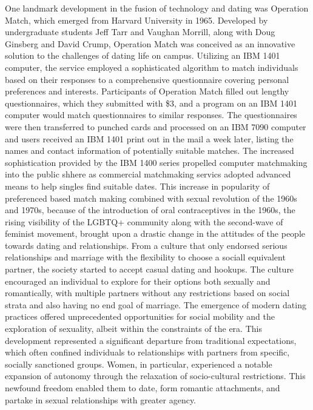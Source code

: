 One landmark development in the fusion of technology and dating was Operation Match, which emerged from Harvard University in 1965. Developed by undergraduate students Jeff Tarr and Vaughan Morrill, along with Doug Ginsberg and David Crump, Operation Match was conceived as an innovative solution to the challenges of dating life on campus. Utilizing an IBM 1401 computer, the service employed a sophisticated algorithm to match individuals based on their responses to a comprehensive questionnaire covering personal preferences and interests.\cite{noauthor_operation_1965}  Participants of Operation Match filled out lengthy questionnaires, which they submitted with \$3, and a program on an IBM 1401 computer would match questionnaires to similar responses.\cite{valley_new_2015}  The questionnaires were then transferred to punched cards and processed on an IBM 7090 computer and users received an IBM 1401 print out in the mail a week later, listing the names and contact information of potentially suitable matches. The increased sophistication provided by the IBM 1400 series propelled computer matchmaking into the public shhere as commercial matchmaking servics adopted advanced means to help singles find suitable dates. This increase in popularity of preferenced based match making combined with sexual revolution of the 1960s and 1970s, because of the introduction of oral contraceptives in the 1960s, the rising visibility of the LGBTQ+ community along with the second-wave of feminist movement,\cite{book:1309549} brought upon a drastic change in the attitudes of the people towards dating and relationships. From a culture that only endorsed serious relationships and marriage with the flexibility to choose a sociall equivalent partner, the society started to accept casual dating and hookups. The culture encouraged an individual to explore for their options both sexually and romantically, with multiple partners without any restrictions based on social strata and also having no end goal of marriage. The emergence of modern dating practices offered unprecedented opportunities for social mobility and the exploration of sexuality, albeit within the constraints of the era. This development represented a significant departure from traditional expectations, which often confined individuals to relationships with partners from specific, socially sanctioned groups. Women, in particular, experienced a notable expansion of autonomy through the relaxation of socio-cultural restrictions\cite{book:1309549}. This newfound freedom enabled them to date, form romantic attachments, and partake in sexual relationships with greater agency. 

